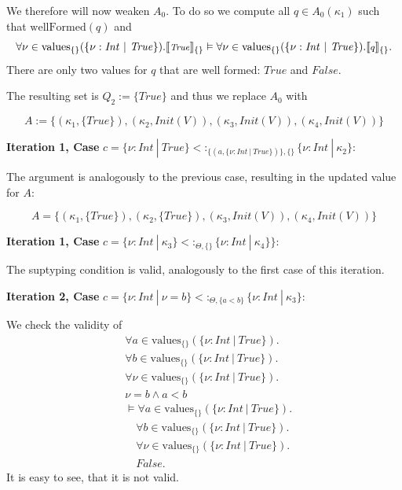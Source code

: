 \documentclass[]{scrbook}
\newcommand{\semantic}[1]{\llbracket \text{\footnotesize\texttt{#1}} \rrbracket}
\theoremstyle{definition}
\theoremstyle{definition}
\theoremstyle{definition}
\theoremstyle{remark}
\begin{document}
We therefore will now weaken \(A_0\). To do so we compute all
\(q\in A_0(\kappa_1)\) such that \(\text{wellFormed}(q)\) and \[
\forall \nu\in\text{values}_{\{\}}(\{\nu:\mathit{Int}\ |\ \mathit{True}\}).\semantic{$\mathit{True}$}_{\{\}}\vDash\forall \nu\in\text{values}_{\{\}}(\{\nu:\mathit{Int}\ |\ \mathit{True}\}).\semantic{$q$}_{\{\}}.
\] There are only two values for \(q\) that are well formed:
\(\mathit{True}\) and \(\mathit{False}\).

The resulting set is \(Q_2 := \{\mathit{True}\}\) and thus we replace
\(A_0\) with

\[
A := \{(\kappa_1,\{\mathit{True}\}),(\kappa_2,\mathit{Init}(V)),(\kappa_3,\mathit{Init}(V)),(\kappa_4,\mathit{Init}(V))\}
\]

\textbf{Iteration 1, Case }
\(c = \{\nu:\mathit{Int}\ |\ \mathit{True}\}<:_{\{(a,\{\nu:\mathit{Int}\ |\ \mathit{True}\})\},\{\}}\{\nu:\mathit{Int}\ |\ \kappa_2\}\):

The argument is analogously to the previous case, resulting in the
updated value for \(A\):

\[
A = \{(\kappa_1,\{\mathit{True}\}),(\kappa_2,\{\mathit{True}\}),(\kappa_3,\mathit{Init}(V)),(\kappa_4,\mathit{Init}(V))\}
\]

\textbf{Iteration 1, Case }
\(c = \{\nu:\mathit{Int}\ |\ \kappa_3\}<:_{\Theta,\{\}}\{\nu:\mathit{Int}\ |\ \kappa_4\}\}\):

The suptyping condition is valid, analogously to the first case of this
iteration.

\textbf{Iteration 2, Case }
\(c = \{\nu:\mathit{Int}\ |\ \nu = b\}<:_{\Theta,\{a < b\}}\{\nu:\mathit{Int}\ |\ \kappa_3\}\):

We check the validity of \[
\begin{aligned}
&\forall a\in\text{values}_{\{\}}(\{\nu:\mathit{Int}\ |\ \mathit{True}\}).\\
&\forall b\in\text{values}_{\{\}}(\{\nu:\mathit{Int}\ |\ \mathit{True}\}).\\
&\forall \nu\in\text{values}_{\{\}}(\{\nu:\mathit{Int}\ |\ \mathit{True}\}).\\
&\nu = b \land a < b\\
&\vDash\forall a\in\text{values}_{\{\}}(\{\nu:\mathit{Int}\ |\ \mathit{True}\}).\\
&\quad\forall b\in\text{values}_{\{\}}(\{\nu:\mathit{Int}\ |\ \mathit{True}\}).\\
&\quad\forall \nu\in\text{values}_{\{\}}(\{\nu:\mathit{Int}\ |\ \mathit{True}\}).\\
&\quad\mathit{False}.
\end{aligned}
\] It is easy to see, that it is not valid.
\end{document}
